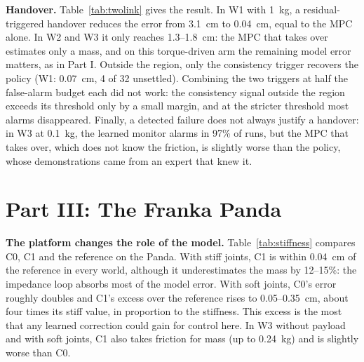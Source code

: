 \documentclass[conference]{IEEEtran}
\newcommand{\Cz}{C0}
\newcommand{\Co}{C1}
\begin{document}
\textbf{Handover.} Table~\ref{tab:twolink} gives the result. In W1 with \SI{1}{kg}, a residual-triggered handover reduces the error from \SI{3.1}{cm} to \SI{0.04}{cm}, equal to the MPC alone. In W2 and W3 it only reaches 1.3--\SI{1.8}{cm}: the MPC that takes over estimates only a mass, and on this torque-driven arm the remaining model error matters, as in Part I. Outside the region, only the consistency trigger recovers the policy (W1: \SI{0.07}{cm}, 4 of 32 unsettled). Combining the two triggers at half the false-alarm budget each did not work: the consistency signal outside the region exceeds its threshold only by a small margin, and at the stricter threshold most alarms disappeared. Finally, a detected failure does not always justify a handover: in W3 at \SI{0.1}{kg}, the learned monitor alarms in 97\% of runs, but the MPC that takes over, which does not know the friction, is slightly worse than the policy, whose demonstrations came from an expert that knew it.

\begin{table}[t]
\centering
\caption{Part II, two-link arm. Median final error in cm (runs not settled, of 32): CFDP alone, the adaptive MPC alone, and handover triggered by the physics, learned or consistency monitor.}
\label{tab:twolink}
\footnotesize
\setlength{\tabcolsep}{2.5pt}

\end{table}

\section{Part III: The Franka Panda}
\label{sec:part3}

\textbf{The platform changes the role of the model.} Table~\ref{tab:stiffness} compares \Cz, \Co{} and the reference on the Panda. With stiff joints, \Co{} is within \SI{0.04}{cm} of the reference in every world, although it underestimates the mass by 12--15\%: the impedance loop absorbs most of the model error. With soft joints, \Cz's error roughly doubles and \Co's excess over the reference rises to 0.05--\SI{0.35}{cm}, about four times its stiff value, in proportion to the stiffness. This excess is the most that any learned correction could gain for control here. In W3 without payload and with soft joints, \Co{} also takes friction for mass (up to \SI{0.24}{kg}) and is slightly worse than \Cz.

\begin{table}[t]
\centering
\caption{Part III. Median final error in cm on the Panda, 16 tasks inside the training region, stiff and soft joints.}
\label{tab:stiffness}
\footnotesize
\setlength{\tabcolsep}{3.5pt}

\end{table}
\end{document}
